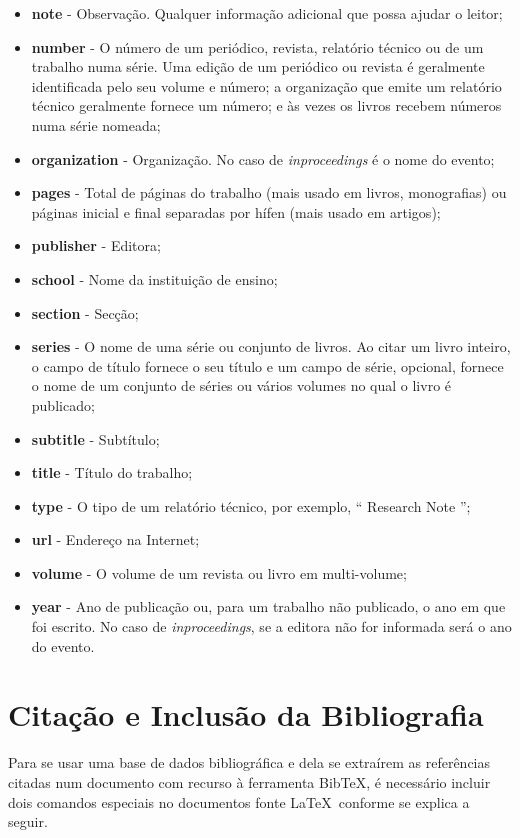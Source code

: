 \documentclass{article}%
\begin{document}
\begin{itemize}
  \item \textbf{note} -  Observação. Qualquer informação adicional que possa ajudar o leitor;
  \item \textbf{number} -  O número de um periódico, revista, relatório técnico ou de um trabalho numa série.
                        Uma edição de um periódico ou revista é geralmente identificada pelo seu volume e número; a organização que emite um relatório técnico geralmente fornece um número; e às vezes os livros recebem números numa série nomeada;
  \item \textbf{organization} - Organização. No caso de \emph{inproceedings} é o nome do evento;
  \item \textbf{pages} -  Total de páginas do trabalho (mais usado em livros, monografias) ou páginas inicial e final separadas
                          por hífen (mais usado em artigos);
  \item \textbf{publisher} - Editora;
  \item \textbf{school}  - Nome da instituição de ensino;
  \item \textbf{section} -  Secção;
  \item \textbf{series}  - O nome de uma série ou conjunto de livros. Ao citar um livro inteiro, o campo de título fornece o seu título e um campo de série, opcional, fornece o nome de um conjunto de séries ou vários volumes no qual o livro é publicado;
  \item \textbf{subtitle} -  Subtítulo;
  \item \textbf{title} - Título do trabalho;
  \item \textbf{type} - O tipo de um relatório técnico, por exemplo, `` Research Note '';
  \item \textbf{url} - Endereço na Internet;
  \item \textbf{volume} - O volume de um revista ou livro em multi-volume;
  \item \textbf{year} - Ano de publicação ou, para um trabalho não publicado, o ano em que foi escrito. No caso de \emph{inproceedings}, se a editora não for informada será o ano do evento.

\end{itemize}

\newpage
\section{Citação e Inclusão da Bibliografia}
Para se usar uma base de dados bibliográfica e dela se extraírem as referências citadas num documento com recurso à ferramenta
Bib\TeX, é necessário incluir dois comandos especiais no documentos fonte \LaTeX\ conforme se explica a seguir.
\end{document}
